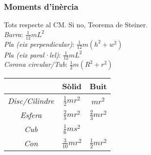 \documentclass[11pt]{article}
\begin{document}
\begin{multicols}{4}
\subsubsection*{Moments d'inèrcia}
Tots respecte al CM. Si no, Teorema de Steiner.\\
\emph{Barra}: $\frac{1}{12}mL^2$ \\
\emph{Pla (eix perpendicular)}: $\frac{1}{12}m(h^2+w^2)$ \\
\emph{Pla (eix paral·lel)}: $\frac{1}{12}mL^2$ \\
\emph{Corona circular/Tub}: $\frac{1}{2}m(R^2+r^2)$\\
\begin{center}
    \begin{tabular}{|c|c|c|} 
        \hline
        & Sòlid & Buit \\
        \hline
        \emph{Disc/Cilindre} & $\frac{1}{2} mr^2$ & $mr^2$ \\ 
        \emph{Esfera} & $\frac{2}{5} mr^2$ & $\frac{2}{3} mr^2$ \\ 
        \emph{Cub} & $\frac{1}{6} ms^2$ & \\ 
        \emph{Con} & $\frac{3}{10} mr^2$ & $\frac{1}{2} mr^2$\\
        \hline
    \end{tabular}
\end{center}
  

\end{multicols}
\end{document}
